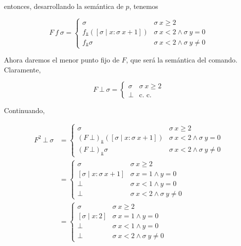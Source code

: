 \documentclass[a4paper, 12pt]{article}
\begin{document}
entonces, desarrollando la semántica de $p$, tenemos 

\begin{equation*}
  F ~ f ~ \sigma = \begin{cases}
    \sigma & \sigma ~ x \geq 2 \\ 
    f_{\Bot} \left( [\sigma \mid x : \sigma ~ x + 1] \right)  & \sigma ~ x < 2
    \land \sigma ~ y = 0 \\
    f_{\Bot} \sigma  & \sigma ~ x < 2 \land \sigma ~ y \neq 0
  \end{cases}
\end{equation*}

Ahora daremos el menor punto fijo de $F$, que será la semántica del comando.
Claramente, 

\begin{equation*}
  F ~ \bot ~ \sigma = \begin{cases}
    \sigma & \sigma ~ x \geq 2 \\ 
    \bot & \text{c. c.}
  \end{cases}
\end{equation*}

Continuando,

\begin{align*}
  F^2 ~ \bot  ~ \sigma 
  &= \begin{cases}
    \sigma & \sigma ~ x \geq 2 \\ 
    (F ~ \bot )_{\Bot} \left( [\sigma \mid x : \sigma ~ x + 1] \right)  & \sigma ~ x < 2
    \land \sigma ~ y = 0 \\
    (F ~ \bot )_{\Bot} \sigma  & \sigma ~ x < 2 \land \sigma ~ y \neq 0
  \end{cases} \\ 
  &= \begin{cases}
    \sigma & \sigma ~ x \geq 2 \\ 
    [\sigma \mid x : \sigma ~ x + 1] & \sigma ~ x = 1 \land  y = 0 \\ 
    \bot  & \sigma ~ x < 1 \land  y = 0 \\ 
    \bot & \sigma ~ x <2 \land  \sigma ~  y \neq 0
  \end{cases}\\
  &= \begin{cases}
    \sigma & \sigma ~ x \geq 2 \\ 
    [\sigma \mid x : 2] & \sigma ~ x = 1 \land  y = 0 \\ 
    \bot  & \sigma ~ x < 1 \land  y = 0 \\ 
    \bot & \sigma ~ x <2 \land  \sigma ~  y \neq 0
  \end{cases}
\end{align*}
\end{document}
